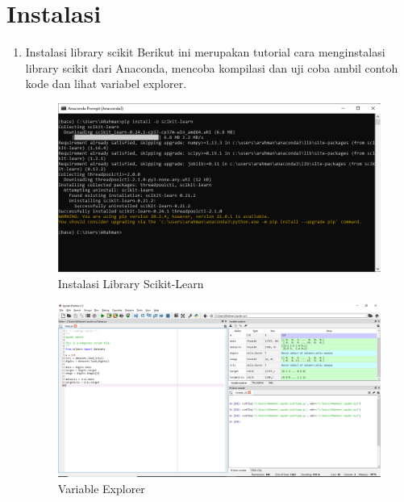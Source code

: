 \section{Instalasi}
\begin{enumerate}
    \item Instalasi library scikit Berikut ini merupakan tutorial cara menginstalasi library scikit dari Anaconda, mencoba kompilasi dan uji coba ambil contoh kode dan lihat variabel explorer.
    
	\begin{figure}
	\includegraphics[scale=0.5]{section/ai2.png}
	\centering
	\caption{Instalasi Library Scikit-Learn}
	\end{figure}
	
	\begin{figure}
	\includegraphics[scale=0.38]{section/ai3.png}
	\centering
	\caption{Variable Explorer}
	\end{figure}
	
\end{enumerate}